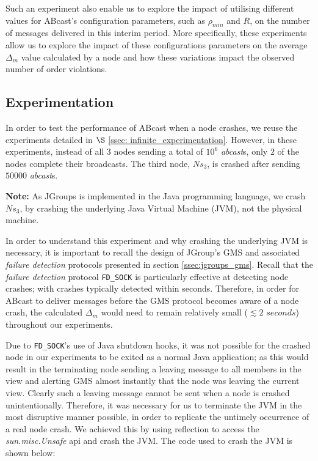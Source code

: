     Such an experiment also enable us to explore the impact of utilising different values for \textsf{ABcast}'s configuration parameters, such as $\rho_{min}$ and $R$, on the number of messages delivered in this interim period.  More specifically, these experiments allow us to explore the impact of these configurations parameters on the average $\Delta_m$ value calculated by a node and how these variations impact the observed number of order violations.  
    
    \subsection{Experimentation}\label{ssec:crash_experiment}
    In order to test the performance of \textsf{ABcast} when a node crashes, we reuse the experiments detailed in $\S$ \ref{ssec: infinite_experimentation}.  However, in these experiments, instead of all $3$ nodes sending a total of $10^6$ \emph{abcast}s, only $2$ of the nodes complete their broadcasts.  The third node, $Ns_3$, is crashed after sending $50000$ \emph{abcast}s.  
    
    \textbf{Note:} As JGroups is implemented in the Java programming language, we crash $Ns_3$, by crashing the underlying Java Virtual Machine (JVM), not the physical machine.  
    
    In order to understand this experiment and why crashing the underlying JVM is necessary, it is important to recall the design of JGroup's GMS and associated \emph{failure detection} protocols presented in section \ref{ssec:jgroups_gms}.  Recall that the \emph{failure detection} protocol \texttt{FD\_SOCK} is particularly effective at detecting node crashes; with crashes typically detected within seconds.  Therefore, in order for \textsf{ABcast} to deliver messages before the GMS protocol becomes aware of a node crash, the calculated $\Delta_m$ would need to remain relatively small ($\lesssim 2$ $seconds$) throughout our experiments.  
    
    Due to \texttt{FD\_SOCK}'s use of Java shutdown hooks, it was not possible for the crashed node in our experiments to be exited as a normal Java application; as this would result in the terminating node sending a leaving message to all members in the view and alerting GMS almost instantly that the node was leaving the current view.  Clearly such a leaving message cannot be sent when a node is crashed unintentionally.  Therefore, it was necessary for us to terminate the JVM in the most disruptive manner possible, in order to replicate the untimely occurrence of a real node crash.  We achieved this by using reflection to access the \emph{sun.misc.Unsafe} api and crash the JVM.  The code used to crash the JVM is shown below:
    

